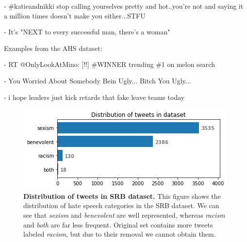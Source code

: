 \documentclass[fleqn,moreauthors,10pt]{ds_report}
\begin{document}
\begin{tcolorbox}[width=0.9\linewidth, center,arc=8pt,sharp corners=downhill, boxrule=0.3pt]
 - \#katieandnikki stop calling yourselves pretty and hot..you're not and saying it a million times doesn't make you either...STFU
\end{tcolorbox}

\begin{tcolorbox}[width=0.9\linewidth, center,arc=8pt,sharp corners=downhill, boxrule=0.3pt]
 - It's "NEXT to every successful man, there's a woman"
\end{tcolorbox}

\noindent Examples from the AHS dataset:

\begin{tcolorbox}[width=0.9\linewidth, center,arc=8pt,sharp corners=downhill, boxrule=0.3pt]
 - RT @OnlyLookAtMino: [!!] \#WINNER trending \#1 on melon search
\end{tcolorbox}

\begin{tcolorbox}[width=0.9\linewidth, center,arc=8pt,sharp corners=downhill, boxrule=0.3pt]
 - You Worried About Somebody Bein Ugly... Bitch You Ugly...
\end{tcolorbox}

\begin{tcolorbox}[width=0.9\linewidth, center,arc=8pt,sharp corners=downhill, boxrule=0.3pt]
 - i hope leaders just kick retards that fake leave teams today
\end{tcolorbox}


\begin{figure}[ht]\centering
	\includegraphics[width=\linewidth]{distribution_tweets_dataset1.png}
	\caption{\textbf{Distribution of tweets in SRB dataset.} This figure shows the distribution of hate speech categories in the SRB dataset. We can see that \textit{sexism} and \textit{benevolent} are well represented, whereas \textit{racism} and \textit{both} are far less frequent. Original set contains more tweets labeled \textit{racism}, but due to their removal we cannot obtain them.}
	\label{fig:distribution_tweets_dataset1}
\end{figure}
\end{document}
